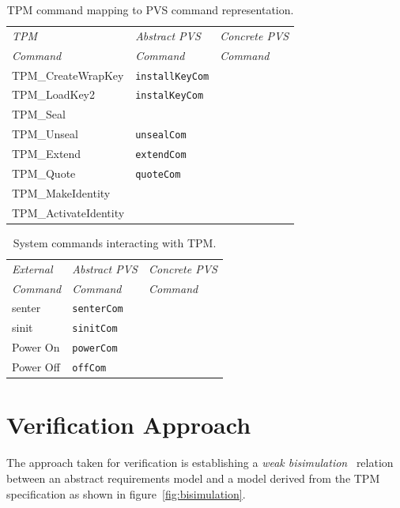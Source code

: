 \documentclass[10pt]{article}
\begin{document}
\begin{table}[hbtp]
  \centering
  \begin{tabular}{lll}
    \hline
    \emph{TPM} & \emph{Abstract PVS} & \emph{Concrete PVS} \\
    \emph{Command} & \emph{Command} & \emph{Command} \\ \hline
    \textsf{TPM\_CreateWrapKey} & \verb+installKeyCom+ & \\
    \textsf{TPM\_LoadKey2} & \verb+instalKeyCom+ & \\
    \textsf{TPM\_Seal} & \\
    \textsf{TPM\_Unseal} & \verb+unsealCom+ & \\
    \textsf{TPM\_Extend} & \verb+extendCom+ & \\
    \textsf{TPM\_Quote} & \verb+quoteCom+ & \\
    \textsf{TPM\_MakeIdentity} & \\
    \textsf{TPM\_ActivateIdentity} & \\
    \hline
  \end{tabular}
  \caption{TPM command mapping to PVS command representation.}
  \label{tab:tpm-to-pvs}
\end{table}

\begin{table}[hbtp]
  \centering
  \begin{tabular}{lll}
    \hline
    \emph{External}& \emph{Abstract PVS} & \emph{Concrete PVS} \\
    \emph{Command} & \emph{Command} & \emph{Command} \\ \hline
    \textsf{senter} & \verb+senterCom+ & \\
    \textsf{sinit} & \verb+sinitCom+ & \\
    Power On & \verb+powerCom+ & \\
    Power Off  & \verb+offCom+ & \\
    \hline
  \end{tabular}
  \caption{System commands interacting with TPM.}
  \label{tab:commands-to-pvs}
\end{table}


\section{Verification Approach}

The approach taken for verification is establishing a \emph{weak
  bisimulation}~\citep{Sangiorgi:12:Introduction-to} relation between
an abstract requirements model and a model derived from the TPM
specification as shown in figure~\ref{fig:bisimulation}.
\end{document}
